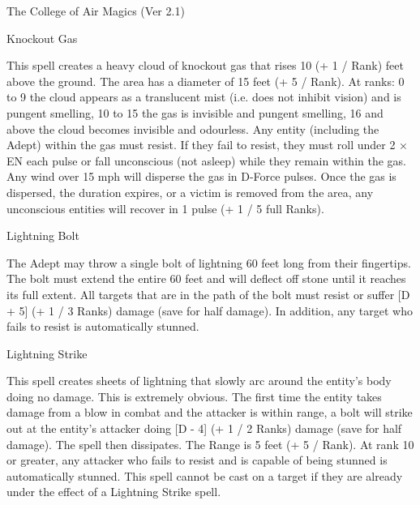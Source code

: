 \begin{Chapter}{The College of Air Magics (Ver 2.1)}
\begin{spell}[S-9]{Knockout Gas}
\begin{effects}
This spell creates a heavy cloud of knockout gas that rises 10 (+ 1 /
Rank) feet above the ground.  The area has a diameter of 15 feet (+ 5
/ Rank).  At ranks: 0 to 9 the cloud appears as a translucent mist
(i.e. does not inhibit vision) and is pungent smelling, 10 to 15 the
gas is invisible and pungent smelling, 16 and above the cloud becomes
invisible and odourless.  Any entity (including the Adept) within the
gas must resist.  If they fail to resist, they must roll under 2 × EN
each pulse or fall unconscious (not asleep) while they remain within
the gas.  Any wind over 15 mph will disperse the gas in D-Force
pulses.  Once the gas is dispersed, the duration expires, or a victim
is removed from the area, any unconscious entities will recover in 1
pulse (+ 1 / 5 full Ranks).
\end{effects}
\end{spell}

\begin{spell}[S-10]{Lightning Bolt}

\begin{effects}
The Adept may throw a single bolt of lightning 60 feet long from their
fingertips.  The bolt must extend the entire 60 feet and will deflect
off stone until it reaches its full extent. All targets that are in
the path of the bolt must resist or suffer [D + 5] (+ 1 / 3 Ranks)
damage (save for half damage).  In addition, any target who fails to
resist is automatically stunned.
\end{effects}
\end{spell}

\begin{spell}[S-11]{Lightning Strike}

\begin{effects}
This spell creates sheets of lightning that slowly arc around the
entity’s body doing no damage.  This is extremely obvious.  The first
time the entity takes damage from a blow in combat and the attacker is
within range, a bolt will strike out at the entity’s attacker doing [D
  - 4] (+ 1 / 2 Ranks) damage (save for half damage).  The spell then
dissipates.  The Range is 5 feet (+ 5 / Rank).  At rank 10 or greater,
any attacker who fails to resist and is capable of being stunned is
automatically stunned.  This spell cannot be cast on a target if they
are already under the effect of a Lightning Strike spell.
\end{effects}
\end{spell}


\end{Chapter}
